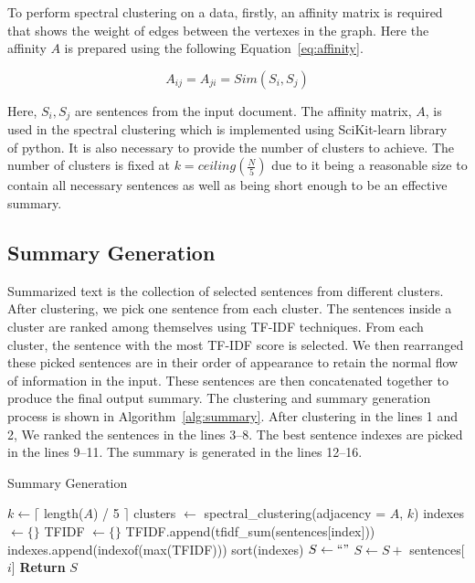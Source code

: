 To perform spectral clustering on a data, firstly, an affinity matrix is required that shows the weight of edges between the vertexes in the graph. Here the affinity $A$ is prepared using the following Equation~\ref{eq:affinity}.

\begin{equation}\label{eq:affinity}
    A_{ij}=A_{ji}=Sim(S_i,S_j)
\end{equation}

Here, $S_i, S_j$ are sentences from the input document. The affinity matrix, $A$, is used in the spectral clustering which is implemented using SciKit-learn library~\cite{Pedregosa-2011-scikit-learn} of python. It is also necessary to provide the number of clusters to achieve. The number of clusters is fixed at $k=ceiling\left(\frac{N}{5}\right)$ due to it being a reasonable size to contain all necessary sentences as well as being short enough to be an effective summary.

\subsection{Summary Generation}\label{subsec:summary-generation}
Summarized text is the collection of selected sentences from different clusters. After clustering, we pick one sentence from each cluster. The sentences inside a cluster are ranked among themselves using TF-IDF techniques. From each cluster, the sentence with the most TF-IDF score is selected. We then rearranged these picked sentences are in their order of appearance to retain the normal flow of information in the input. These sentences are then concatenated together to produce the final output summary. The clustering and summary generation process is shown in Algorithm~\ref{alg:summary}. After clustering in the lines 1 and 2, We ranked the sentences in the lines 3--8. The best sentence indexes are picked in the lines 9--11. The summary is generated in the lines 12--16.

\begin{algorithm} \caption{Summary Generation} \label{alg:summary}
\begin{algorithmic}[1]
    \State $k \gets \lceil$ length($A$) / 5 $\rceil$
    \State clusters $\gets$ spectral\_clustering(adjacency = $A$, $k$)
    \State indexes $\gets \{\}$
        \State TFIDF $\gets \{\}$
            \State TFIDF.append(tfidf\_sum(sentences[index]))
        \EndFor
        \State indexes.append(indexof(max(TFIDF)))
    \EndFor
    \State sort(indexes)
    \State $S \gets `` "$
        \State $S \gets S +$ sentences[$i$]
    \EndFor
    \State \textbf{Return} $S$
\end{algorithmic}
\end{algorithm}


